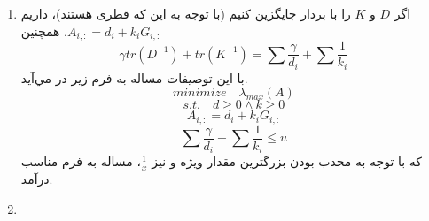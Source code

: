 \begin{enumerate}
	\item 
اگر $D$ و $K$ را با بردار جایگزین کنیم (با توجه به این که قطری هستند)، داریم
$A_{i,:} = d_i + k_iG_{i,:}$.
همچنین
\[
\gamma tr(D^{-1}) + tr(K^{-1}) = \sum \frac{\gamma}{d_i} + \sum \frac{1}{k_i}
\]
با این توصیفات مساله به فرم زیر در مي‌آید.\\
\[
minimize \quad \lambda_{max}(A)
\]\[
s.t. \quad d \ge 0 \land k \ge 0\]\[
A_{i,:} = d_i + k_iG_{i,:}\]\[
\sum \frac{\gamma}{d_i} + \sum \frac{1}{k_i} \le u
\]
که با توجه به محدب بودن بزرگترین مقدار ویژه و نیز $\frac{1}{x}$، مساله به فرم مناسب درآمد.
\item 

\end{enumerate}